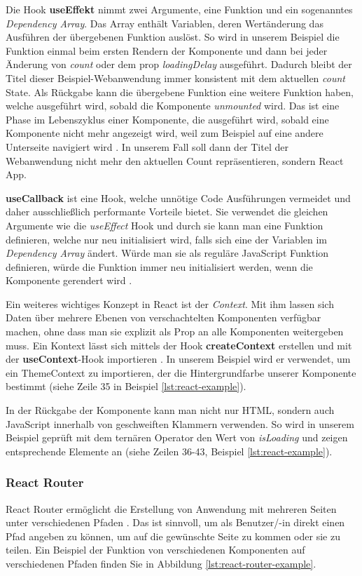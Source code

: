 Die Hook \textbf{useEffekt} nimmt zwei Argumente, eine Funktion und ein sogenanntes \textit{Dependency Array}. Das Array enthält Variablen, deren Wertänderung das Ausführen der übergebenen Funktion auslöst. So wird in unserem Beispiel die Funktion einmal beim ersten Rendern der Komponente und dann bei jeder Änderung von \textit{count} oder dem prop \textit{loadingDelay} ausgeführt. Dadurch bleibt der Titel dieser Beispiel-Webanwendung immer konsistent mit dem aktuellen \textit{count} State. Als Rückgabe kann die übergebene Funktion eine weitere Funktion haben, welche ausgeführt wird, sobald die Komponente \textit{unmounted} wird. Das ist eine Phase im Lebenszyklus einer Komponente, die ausgeführt wird, sobald eine Komponente nicht mehr angezeigt wird, weil zum Beispiel auf eine andere Unterseite navigiert wird \cite{react-key-concepts}. In unserem Fall soll dann der Titel der Webanwendung nicht mehr den aktuellen Count repräsentieren, sondern \glqq React App\grqq .

\textbf{useCallback} ist eine Hook, welche unnötige Code Ausführungen vermeidet und daher ausschließlich performante Vorteile bietet. Sie verwendet die gleichen Argumente wie die \textit{useEffect} Hook und durch sie kann man eine Funktion definieren, welche nur neu initialisiert wird, falls sich eine der Variablen im \textit{Dependency Array} ändert. Würde man sie als reguläre JavaScript Funktion definieren, würde die Funktion immer neu initialisiert werden, wenn die Komponente gerendert wird \cite{react-key-concepts}.

Ein weiteres wichtiges Konzept in React ist der \textit{Context}. Mit ihm lassen sich Daten über mehrere Ebenen von verschachtelten Komponenten verfügbar machen, ohne dass man sie explizit als Prop an alle Komponenten weitergeben muss. Ein Kontext lässt sich mittels der Hook \textbf{createContext} erstellen und mit der \textbf{useContext}-Hook importieren \cite{react-key-concepts}. In unserem Beispiel wird er verwendet, um ein ThemeContext zu importieren, der die Hintergrundfarbe unserer Komponente bestimmt (siehe Zeile 35 in Beispiel \ref{lst:react-example}).

In der Rückgabe der Komponente kann man nicht nur HTML, sondern auch JavaScript innerhalb von geschweiften Klammern verwenden. So wird in unserem Beispiel geprüft mit dem ternären Operator den Wert von \textit{isLoading} und zeigen entsprechende Elemente an (siehe Zeilen 36-43, Beispiel \ref{lst:react-example}).

\subsubsection{React Router}
\label{sec:react-router}
React Router ermöglicht die Erstellung von Anwendung mit mehreren Seiten unter verschiedenen Pfaden \cite{react-key-concepts}. Das ist sinnvoll, um als Benutzer/-in direkt einen Pfad angeben zu können, um auf die gewünschte Seite zu kommen oder sie zu teilen. Ein Beispiel der Funktion von verschiedenen Komponenten auf verschiedenen Pfaden finden Sie in Abbildung \ref{lst:react-router-example}. 

